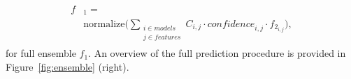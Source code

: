 \begin{align}
\begin{split}
f&_{1} = \\
&\text{normalize}\Big( \sum_{\substack{i \in models \\ j \in features}} C_{i,j} \cdot \textit{confidence}_{i,j} \cdot f_{2_{i,j}}\Big),
\end{split}
\end{align}
for full ensemble $f_1$. An overview of the full prediction procedure is provided in Figure~\ref{fig:ensemble} (right).




















